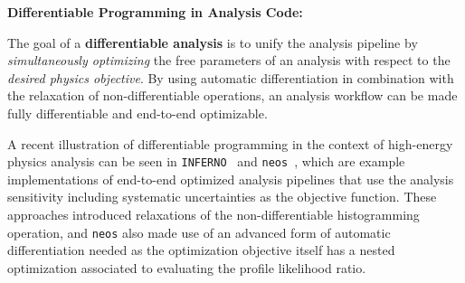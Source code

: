 \documentclass{article}
\begin{document}
\medskip

{\flushleft \textbf{Differentiable Programming in Analysis Code:}}

The goal of a \textbf{differentiable analysis} is to unify the analysis pipeline by \textit{simultaneously optimizing} the free parameters of an analysis with respect to the \textit{desired physics objective}. 
By using automatic differentiation in combination with the relaxation of non-differentiable operations, an analysis workflow can be made fully differentiable and end-to-end optimizable. 


A recent illustration of differentiable programming in the context of high-energy physics analysis can be seen in \texttt{INFERNO}~\cite{deCastro:2018mgh} and \texttt{neos}~\cite{neos}, which are example implementations of end-to-end optimized analysis pipelines that use the analysis sensitivity including systematic uncertainties as the objective function. These approaches introduced relaxations of the non-differentiable histogramming operation, and \texttt{neos} also made use of an advanced form of automatic differentiation needed as the optimization objective itself has a nested optimization associated to evaluating the profile likelihood ratio. 


\end{document}
